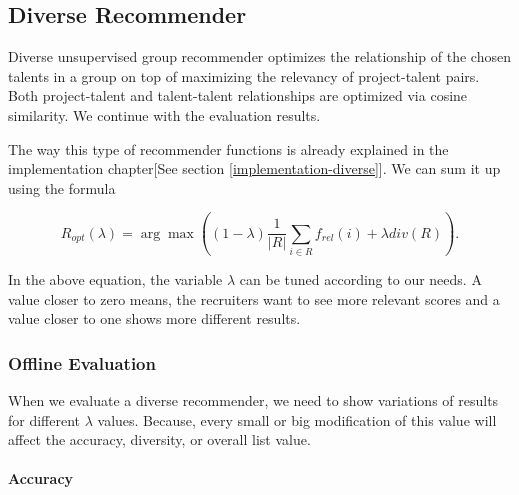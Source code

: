 \subsection{Diverse Recommender}

Diverse unsupervised group recommender optimizes the relationship of the chosen talents in a group on top of maximizing the relevancy of project-talent pairs. Both project-talent and talent-talent relationships are optimized via cosine similarity. We continue with the evaluation results.

The way this type of recommender functions is already explained in the implementation chapter[See section \ref{implementation-diverse}]. We can sum it up using the formula

\begin{equation}
R _ { o p t } ( \lambda ) =  { \arg \max } (( 1 - \lambda ) \frac { 1 } { | R | } \sum _ { i \in R } f _ { r e l } ( i ) + \lambda d i v ( R ) ).
\end{equation}

In the above equation, the variable $\lambda$ can be tuned according to our needs. A value closer to zero means, the recruiters want to see more relevant scores and a value closer to one shows more different results. 

\subsubsection{Offline Evaluation}

When we evaluate a diverse recommender, we need to show variations of results for different $\lambda$ values. Because, every small or big modification of this value will affect the accuracy, diversity, or overall list value.

\paragraph{Accuracy}

